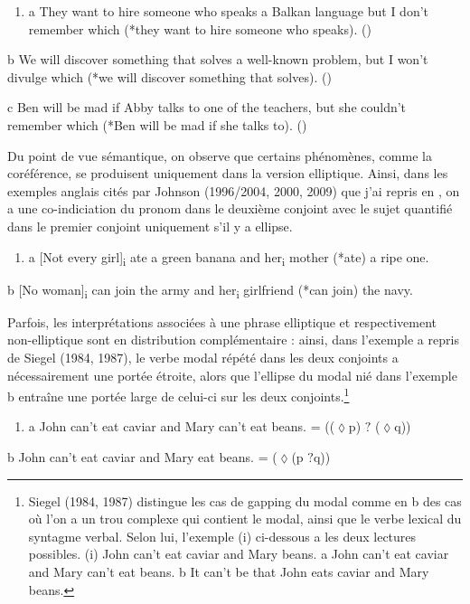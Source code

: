 \begin{enumerate}
\item \label{bkm:Ref302543968}a  They want to hire someone who speaks a Balkan language but I don't remember which (*they want to hire someone who speaks).      (\citet[5]{Merchant2001})


\end{enumerate}
b  We will discover something that solves a well-known problem, but I won't divulge which (*we will discover something that solves).      (\citet[2]{Johnson2008})

c  Ben will be mad if Abby talks to one of the teachers, but she couldn't remember which (*Ben will be mad if she talks to).        (\citet[136]{Merchant2008})

Du point de vue sémantique, on observe que certains phénomènes, comme la coréférence, se produisent uniquement dans la version elliptique. Ainsi, dans les exemples anglais cités par Johnson (1996/2004, 2000, 2009) que j'ai repris en , on a une co-indiciation du pronom dans le deuxième conjoint avec le sujet quantifié dans le premier conjoint uniquement s'il y a ellipse.


\begin{enumerate}
\item \label{bkm:Ref286421489}a  [Not every girl]\textsubscript{i} ate a green banana and her\textsubscript{i} mother (*ate) a ripe one. 


\end{enumerate}
  b  [No woman]\textsubscript{i} can join the army and her\textsubscript{i} girlfriend (*can join) the navy. 

Parfois, les interprétations associées à une phrase elliptique et respectivement non-elliptique sont en distribution complémentaire : ainsi, dans l'exemple a repris de Siegel (1984, 1987), le verbe modal répété dans les deux conjoints a nécessairement une portée étroite, alors que l'ellipse du modal nié dans l'exemple b entraîne une portée large de celui-ci sur les deux conjoints.\footnote{Siegel (1984, 1987) distingue les cas de gapping du modal comme en b des cas où l'on a un trou complexe qui contient le modal, ainsi que le verbe lexical du syntagme verbal. Selon lui, l'exemple (i) ci-dessous a les deux lectures possibles.
(i)  John can't eat caviar and Mary beans.
a  John can't eat caviar and Mary can't eat beans.
b  It can't be that John eats caviar and Mary beans.} 


\begin{enumerate}
\item \label{bkm:Ref286420421}a  John can't eat caviar and Mary can't eat beans.  = (({\textlnot}${\lozenge}$p)  ${?}$ ({\textlnot}${\lozenge}$q))


\end{enumerate}
b  John can't eat caviar and Mary eat beans.    = ({\textlnot}${\lozenge}$(p ${?}$q))

